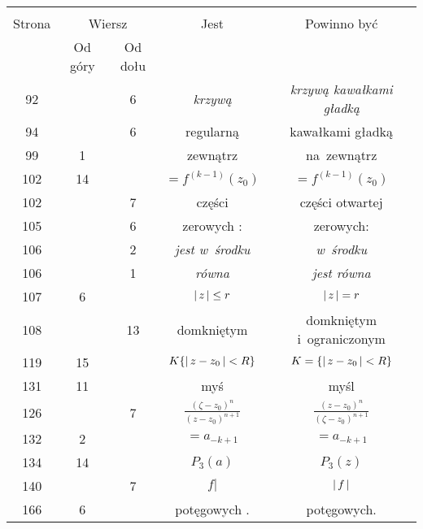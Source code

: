 \documentclass[a4paper,11pt]{article}
\begin{document}
\begin{center}
  \begin{tabular}{|c|c|c|c|c|}
    \hline
    & \multicolumn{2}{c|}{} & & \\
    Strona & \multicolumn{2}{c|}{Wiersz} & Jest
                              & Powinno być \\ \cline{2-3}
    & Od góry & Od dołu & & \\
    \hline
    92  & &  6 & \emph{krzywą} & \emph{krzywą kawałkami gładką} \\
    94  & &  6 & regularną & kawałkami gładką \\
    99  &  1 & & zewnątrz & na~zewnątrz \\
    102 & 14 & & $=\!\! f^{ ( k - 1 ) }( z_{ 0 } )$
           & $= f^{ ( k - 1 ) }( z_{ 0 } )$ \\
    102 & &  7 & części & części otwartej \\
    105 & &  6 & zerowych : & zerowych: \\
    106 & &  2 & \emph{jest w~środku} & \emph{w~środku} \\
    106 & &  1 & \emph{równa} & \emph{jest równa} \\
    107 &  6 & & $\left| \,  z  \, \right| \leq r$ & $\left| \,  z  \, \right| = r$ \\
    108 & & 13 & domkniętym & domkniętym i~ograniczonym \\
    119 & 15 & & $K \{ \left| \,  z - z_{ 0 }  \, \right| < R \}$
           & $K = \{ \left| \,  z - z_{ 0 }  \, \right| < R \}$ \\
    131 & 11 & & myś & myśl \\
    126 & &  7 & $\frac{ ( \zeta - z_{ 0 } )^{ n } }{
                 ( z - z_{ 0 } )^{ n + 1 } }$
           & $\frac{ ( z - z_{ 0 } )^{ n } }{
             ( \zeta - z_{ 0 } )^{ n + 1 } }$ \\
    132 &  2 & & $=\!\! a_{ -k + 1 }$ & $= a_{ -k + 1 }$ \\
    134 & 14 & & $P_{ 3 }( a )$ & $P_{ 3 }( z )$ \\
    140 & &  7 & $f |$ & $\left| \,  f  \, \right|$ \\
    166 &  6 & & potęgowych . & potęgowych. \\
    \hline
  \end{tabular}
\end{center}
\end{document}
